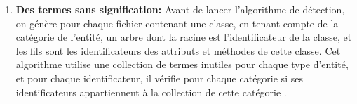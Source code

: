 \begin{enumerate}
\begin{framed}
{ 9.			add<id> to violations\newline
}
\end{framed}
\item \textbf {Des termes sans signification:}
Avant de lancer l'algorithme de détection, on génère pour chaque fichier contenant une classe, en tenant compte de la catégorie de l'entité, un arbre dont la racine est l'identificateur de la classe, et les fils sont les identificateurs des attributs et méthodes de cette classe.
\newline
Cet algorithme utilise une collection de termes inutiles pour chaque type d'entité, et pour chaque identificateur, il vérifie pour chaque catégorie si ses identificateurs appartiennent à la collection de cette catégorie  \cite{abebe2009lexicon}.
\begin{framed}
  {\selectfont  

}
\end{framed}
\end{enumerate}
